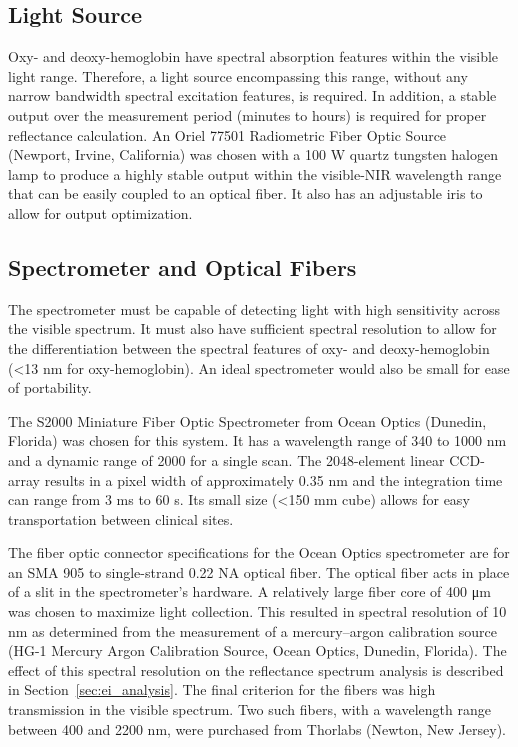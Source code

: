 \subsection{Light Source}
Oxy- and deoxy-hemoglobin have spectral absorption features within the visible light range.\cite{Young1997,Lister2012} Therefore, a light source encompassing this range, without any narrow bandwidth spectral excitation features, is required. In addition, a stable output over the measurement period (minutes to hours) is required for proper reflectance calculation. An Oriel 77501 Radiometric Fiber Optic Source (Newport, Irvine, California) was chosen with a 100 W quartz tungsten halogen lamp to produce a highly stable output within the visible-NIR wavelength range that can be easily coupled to an optical fiber. It also has an adjustable iris to allow for output optimization.

\subsection{Spectrometer and Optical Fibers}
The spectrometer must be capable of detecting light with high sensitivity across the visible spectrum. It must also have sufficient spectral resolution to allow for the differentiation between the spectral features of oxy- and deoxy-hemoglobin (<13 nm for oxy-hemoglobin). An ideal spectrometer would also be small for ease of portability.

The S2000 Miniature Fiber Optic Spectrometer from Ocean Optics (Dunedin, Florida) was chosen for this system. It has a wavelength range of 340 to 1000 nm and a dynamic range of 2000 for a single scan. The 2048-element linear CCD-array results in a pixel width of approximately 0.35 nm and the integration time can range from 3 ms to 60 s. Its small size (<150 mm cube) allows for easy transportation between clinical sites.

The fiber optic connector specifications for the Ocean Optics spectrometer are for an SMA 905 to single-strand 0.22 NA optical fiber. The optical fiber acts in place of a slit in the spectrometer’s hardware. A relatively large fiber core of 400 \si{\um} was chosen to maximize light collection. This resulted in spectral resolution of 10 nm as determined from the measurement of a mercury–argon calibration source (HG-1 Mercury Argon Calibration Source, Ocean Optics, Dunedin, Florida). The effect of this spectral resolution on the reflectance spectrum analysis is described in Section~\ref{sec:ei_analysis}. The final criterion for the fibers was high transmission in the visible spectrum. Two such fibers, with a wavelength range between 400 and 2200 nm, were purchased from Thorlabs (Newton, New Jersey).

